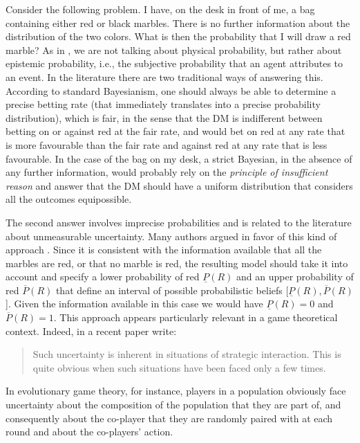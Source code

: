 \documentclass[fleqn,reqno,11pt]{article}
\begin{document}
Consider the following problem. I have, on the desk in front of me, a bag containing either red
or black marbles. There is no further information about the distribution of the two
colors. What is then the probability that I will draw a red marble? As in \citet{walley96}, we
are not talking about physical probability, but rather about epistemic probability, i.e., the
subjective probability that an agent attributes to an event.  In the literature there are two
traditional ways of answering this. According to standard Bayesianism, one should always be
able to determine a precise betting rate (that immediately translates into a precise
probability distribution), which is fair, in the sense that the DM is indifferent between
betting on or against red at the fair rate, and would bet on red at any rate that is more
favourable than the fair rate and against red at any rate that is less favourable. In the case
of the bag on my desk, a strict Bayesian, in the absence of any further information, would
probably rely on the \textit{principle of insufficient reason} and answer that the DM should
have a uniform distribution that considers all the outcomes equipossible.


The second answer involves imprecise probabilities and is related to the literature about
unmeasurable uncertainty. Many authors argued in favor of this kind of approach
\citep[e.g.,][]{levi74,gardsah82,walley96}. Since it is consistent with the information
available that all the marbles are red, or that no marble is red, the resulting model should
take it into account and specify a lower probability of red $\underline{P}(R)$ and an upper
probability of red $\overline{P}(R)$ that define an interval of possible probabilistic beliefs
[$\underline{P}(R), \overline{P}(R)$]. Given the information available in this case we would
have $\underline{P}(R)=0$ and $\overline{P}(R)=1$. This approach appears particularly relevant
in a game theoretical context. Indeed, in a recent paper \citet{BattCerrMM15} write:

\begin{quote}
  Such uncertainty is inherent in situations of strategic interaction. This is quite obvious
  when such situations have been faced only a few times.
\end{quote}

\noindent In evolutionary game theory, for instance, players in a population obviously face
uncertainty about the composition of the population that they are part of, and consequently
about the co-player that they are randomly paired with at each round and about the co-players'
action. 
\end{document}
